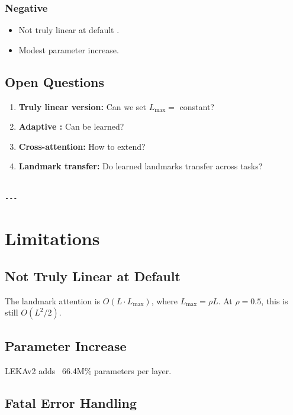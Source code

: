 \subsubsection{Negative}
\begin{itemize}
\item Not truly linear at default  .
\item Modest parameter increase.

\end{itemize}
\subsection{Open Questions}

\begin{enumerate}
\item \textbf{Truly linear version:} Can we set $L_\text{max} = $ constant?
\item \textbf{Adaptive  :} Can   be learned?
\item \textbf{Cross-attention:} How to extend?
\item \textbf{Landmark transfer:} Do learned landmarks transfer across tasks?
\end{enumerate}
\begin{lstlisting}

---
\end{lstlisting}

\section{Limitations}

\subsection{Not Truly Linear at Default}

The landmark attention is $O(L \cdot L_\text{max})$, where $L_\text{max} = \rho L$. 
At $\rho = 0.5$, this is still $O(L^2/2)$.

\subsection{Parameter Increase}

LEKAv2 adds ~66.4M\% parameters per layer.

\subsection{Fatal Error Handling}

